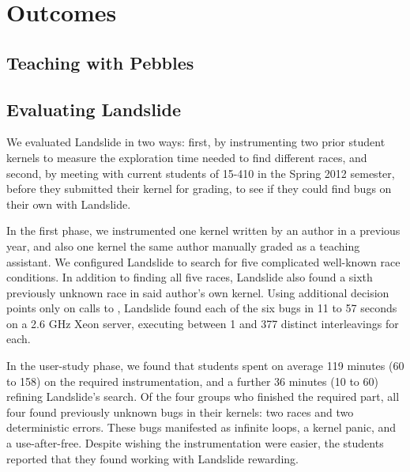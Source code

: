 \section{Outcomes}

\subsection{Teaching with Pebbles}


\subsection{Evaluating Landslide}

We evaluated Landslide in two ways: first, by instrumenting two prior student kernels to measure the exploration time needed to find different races, and second, by meeting with current students of 15-410 in the Spring 2012 semester, before they submitted their kernel for grading, to see if they could find bugs on their own with Landslide.

In the first phase, we instrumented one kernel written by an author in a previous year, and also one kernel the same author manually graded as a teaching assistant.
We configured Landslide to search for five complicated well-known race conditions.
In addition to finding all five races, Landslide also found a sixth previously unknown race in said author's own kernel.
Using additional decision points only on calls to , Landslide found each of the six bugs in 11 to 57 seconds on a 2.6 GHz Xeon server, executing between 1 and 377 distinct interleavings for each.

In the user-study phase, we found that students spent on average 119 minutes (60 to 158) on the required instrumentation, and a further 36 minutes (10 to 60) refining Landslide's search.
Of the four groups who finished the required part, all four found previously unknown bugs in their kernels: two races and two deterministic errors.
These bugs manifested as infinite loops, a kernel panic, and a use-after-free.
Despite wishing the instrumentation were easier, the students reported that they found working with Landslide rewarding.

